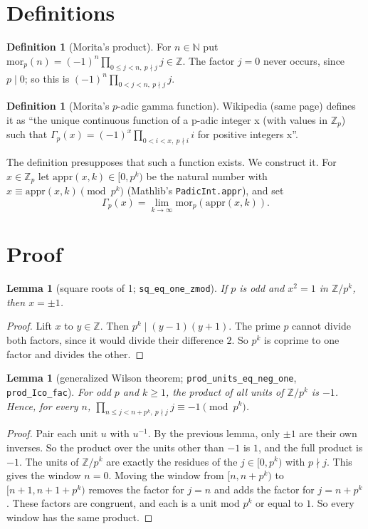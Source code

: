\documentclass[11pt]{article}
\newtheorem{lemma}[theorem]{Lemma}
\theoremstyle{definition}
\newtheorem{definition}[theorem]{Definition}
\newcommand{\Zp}{\mathbb{Z}_p}
\begin{document}
\section{Definitions}

\begin{definition}[Morita's product]
For $n \in \mathbb{N}$ put $\mathrm{mor}_p(n) = (-1)^n \prod_{0 \le j < n,\ p \nmid j} j \in \mathbb{Z}$.
The factor $j = 0$ never occurs, since $p \mid 0$; so this is $(-1)^n \prod_{0<j<n,\ p\nmid j} j$.
\end{definition}

\begin{definition}[Morita's $p$-adic gamma function]
Wikipedia (same page) defines it as ``the unique continuous function of a p-adic integer x
(with values in $\mathbb{Z}_p$) such that $\Gamma_p(x) = (-1)^x \prod_{0<i<x,\ p \nmid i} i$
for positive integers x''.
\end{definition}

The definition presupposes that such a function exists. We construct it. For $x \in \Zp$ let
$\mathrm{appr}(x,k) \in [0, p^k)$ be the natural number with $x \equiv \mathrm{appr}(x,k) \pmod{p^k}$
(Mathlib's \texttt{PadicInt.appr}), and set
\[
  \Gamma_p(x) = \lim_{k \to \infty} \mathrm{mor}_p(\mathrm{appr}(x,k)).
\]

\section{Proof}

\begin{lemma}[square roots of 1; \texttt{sq\_eq\_one\_zmod}]
If $p$ is odd and $x^2 = 1$ in $\mathbb{Z}/p^k$, then $x = \pm 1$.
\end{lemma}
\begin{proof}
Lift $x$ to $y \in \mathbb{Z}$. Then $p^k \mid (y-1)(y+1)$. The prime $p$ cannot divide both
factors, since it would divide their difference $2$. So $p^k$ is coprime to one factor and
divides the other.
\end{proof}

\begin{lemma}[generalized Wilson theorem; \texttt{prod\_units\_eq\_neg\_one}, \texttt{prod\_Ico\_fac}]
For odd $p$ and $k \ge 1$, the product of all units of $\mathbb{Z}/p^k$ is $-1$. Hence, for every
$n$, $\prod_{n \le j < n + p^k,\ p \nmid j} j \equiv -1 \pmod{p^k}$.
\end{lemma}
\begin{proof}
Pair each unit $u$ with $u^{-1}$. By the previous lemma, only $\pm 1$ are their own inverses.
So the product over the units other than $-1$ is $1$, and the full product is $-1$. The units
of $\mathbb{Z}/p^k$ are exactly the residues of the $j \in [0,p^k)$ with $p \nmid j$. This gives
the window $n = 0$. Moving the window from $[n, n+p^k)$ to $[n+1, n+1+p^k)$ removes the
factor for $j = n$ and adds the factor for $j = n + p^k$. These factors are congruent, and each
is a unit mod $p^k$ or equal to $1$. So every window has the same product.
\end{proof}
\end{document}
